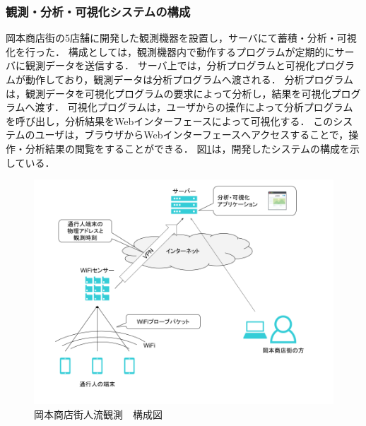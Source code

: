 \subsubsection{観測・分析・可視化システムの構成}
岡本商店街の5店舗に開発した観測機器を設置し，サーバにて蓄積・分析・可視化を行った．
構成としては，観測機器内で動作するプログラムが定期的にサーバに観測データを送信する．
サーバ上では，分析プログラムと可視化プログラムが動作しており，観測データは分析プログラムへ渡される．
分析プログラムは，観測データを可視化プログラムの要求によって分析し，結果を可視化プログラムへ渡す．
可視化プログラムは，ユーザからの操作によって分析プログラムを呼び出し，分析結果をWebインターフェースによって可視化する．
このシステムのユーザは，ブラウザからWebインターフェースへアクセスすることで，操作・分析結果の閲覧をすることができる．
図\ref{fig:okamoto_diag1}は，開発したシステムの構成を示している．
\begin{figure}[htbp]
\includegraphics[width=16cm]{images/okamoto_diag1.png}
\caption{岡本商店街人流観測　構成図}
\label{fig:okamoto_diag1}
\end{figure}

